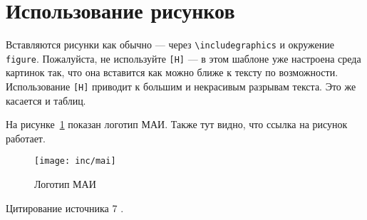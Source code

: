 \section{Использование рисунков}

Вставляются рисунки как обычно --- через 
\texttt{\textbackslash includegraphics} и окружение 
\texttt{figure}. 
Пожалуйста, не используйте \texttt{[H]} --- 
в этом шаблоне уже настроена среда картинок так, 
что она вставится как можно ближе к тексту по возможности. 
Использование \texttt{[H]} приводит к большим и некрасивым 
разрывам текста. Это же касается и таблиц.

На рисунке~\ref{fig:fig01} показан логотип МАИ. 
Также тут видно, что ссылка на рисунок работает.
\begin{figure}
  \centering
  \texttt{[image: inc/mai]}
  \caption{Логотип МАИ}
  \label{fig:fig01}
\end{figure}


\lipsum[3]

Цитирование источника 7 \cite{Wikipedia7}.
